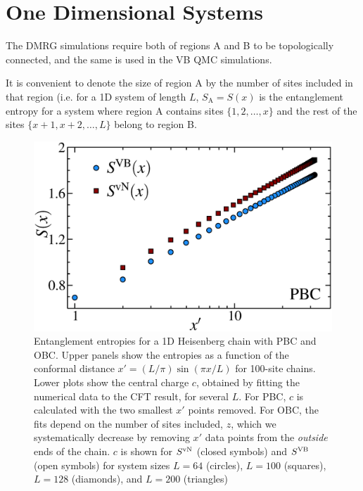 \section{One Dimensional Systems}

The DMRG simulations require both of regions A and B to be topologically connected, and the 
same  is used in the VB QMC simulations.

It is convenient to denote the size of region A by the number of sites included in that region 
(i.e. for a 1D system of length $L$, $S_{\text{A}} = S(x)$ is the entanglement entropy for a system where region A contains sites $\{1,2,\dots,x\}$ and the rest of the sites $\{x+1,x+2,\dots,L\}$
belong to region B.



\begin{figure} {
\includegraphics[width=4.5in]{./figures/paper1/figure1/thesis_pbc.eps} 
\centering
\caption[1D PBC Results for VB EE and von Neumann EE]{
{\color{red}
Entanglement entropies for a 1D Heisenberg chain with PBC and OBC. Upper
panels show the entropies as a function of the conformal distance $x'  = (L/\pi)\sin (\pi x/L)$ for
100-site chains.  Lower plots show the central
charge $c$, obtained by fitting the numerical data to the CFT result, for
several $L$.  For PBC, $c$ is calculated with the two smallest $x'$ points
removed.  For OBC, the fits depend on the number of sites included, $z$,
which we systematically decrease by removing $x'$ data points from the
{\it outside} ends of the chain.  $c$ is shown for $S^{\rm vN}$
(closed symbols) and $S^{\rm VB}$ (open symbols) for system sizes $L=64$
(circles), $L=100$ (squares), $L=128$ (diamonds), and $L=200$ (triangles)
\label{1dOBC}}
} }
\end{figure}

